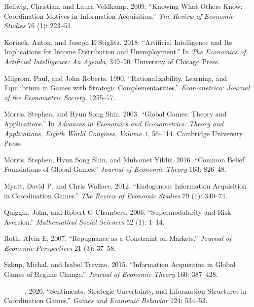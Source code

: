 \documentclass[
]{article}
\newlength{\cslhangindent}
\newenvironment{CSLReferences}[2] %
 {\begin{list}{}{%
  \setlength{\itemindent}{0pt}
  \setlength{\leftmargin}{0pt}
  \setlength{\parsep}{0pt}
  \ifodd #1
   \setlength{\leftmargin}{\cslhangindent}
   \setlength{\itemindent}{-1\cslhangindent}
  \fi
  \setlength{\itemsep}{#2\baselineskip}}}
 {\end{list}}
\theoremstyle{plain}
\theoremstyle{definition}
\theoremstyle{remark}
\begin{document}
\begin{CSLReferences}{1}{0}
Hellwig, Christian, and Laura Veldkamp. 2009. {``Knowing What Others
Know: Coordination Motives in Information Acquisition.''} \emph{The
Review of Economic Studies} 76 (1): 223--51.

Korinek, Anton, and Joseph E Stiglitz. 2018. {``Artificial Intelligence
and Its Implications for Income Distribution and Unemployment.''} In
\emph{The Economics of Artificial Intelligence: An Agenda}, 349--90.
University of Chicago Press.

Milgrom, Paul, and John Roberts. 1990. {``Rationalizability, Learning,
and Equilibrium in Games with Strategic Complementarities.''}
\emph{Econometrica: Journal of the Econometric Society}, 1255--77.

Morris, Stephen, and Hyun Song Shin. 2003. {``Global Games: Theory and
Applications.''} In \emph{Advances in Economics and Econometrics: Theory
and Applications, Eighth World Congress, Volume 1}, 56--114. Cambridge
University Press.

Morris, Stephen, Hyun Song Shin, and Muhamet Yildiz. 2016. {``Common
Belief Foundations of Global Games.''} \emph{Journal of Economic Theory}
163: 826--48.

Myatt, David P, and Chris Wallace. 2012. {``Endogenous Information
Acquisition in Coordination Games.''} \emph{The Review of Economic
Studies} 79 (1): 340--74.

Quiggin, John, and Robert G Chambers. 2006. {``Supermodularity and Risk
Aversion.''} \emph{Mathematical Social Sciences} 52 (1): 1--14.

Roth, Alvin E. 2007. {``Repugnance as a Constraint on Markets.''}
\emph{Journal of Economic Perspectives} 21 (3): 37--58.

Szkup, Michal, and Isabel Trevino. 2015. {``Information Acquisition in
Global Games of Regime Change.''} \emph{Journal of Economic Theory} 160:
387--428.

---------. 2020. {``Sentiments, Strategic Uncertainty, and Information
Structures in Coordination Games.''} \emph{Games and Economic Behavior}
124: 534--53.


\end{CSLReferences}
\end{document}
